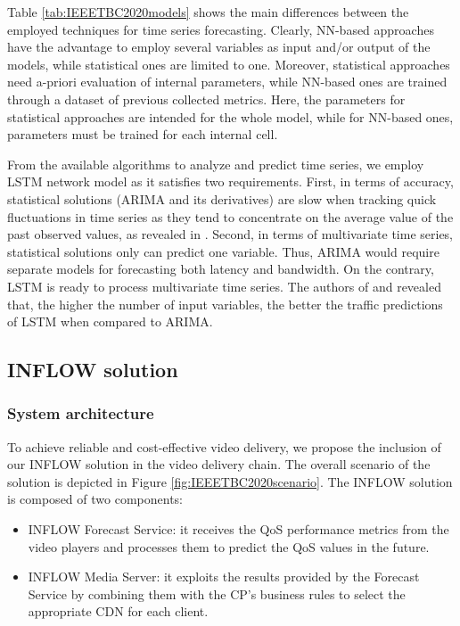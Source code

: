 Table \ref{tab:IEEETBC2020models} shows the main differences between the employed techniques for time series forecasting. Clearly, NN-based approaches have the advantage to employ several variables as input and/or output of the models, while statistical ones are limited to one. Moreover, statistical approaches need a-priori evaluation of internal parameters, while NN-based ones are trained through a dataset of previous collected metrics. Here, the parameters for statistical approaches are intended for the whole model, while for NN-based ones, parameters must be trained for each internal cell.

From the available algorithms to analyze and predict time series, we employ LSTM network model as it satisfies two requirements. First, in terms of accuracy, statistical solutions (ARIMA and its derivatives) are slow when tracking quick fluctuations in time series as they tend to concentrate on the average value of the past observed values, as revealed in \cite{wang2017}. Second, in terms of multivariate time series, statistical solutions only can predict one variable. Thus, ARIMA would require separate models for forecasting both latency and bandwidth. On the contrary, LSTM is ready to process multivariate time series. The authors of \cite{azari2019} and \cite{azari2019-2} revealed that, the higher the number of input variables, the better the traffic predictions of LSTM when compared to ARIMA.


\subsection{INFLOW solution}
\label{sec:system}

\subsubsection{System architecture}
\label{sec:detailedcontribution}

To achieve reliable and cost-effective video delivery, we propose the inclusion of our INFLOW solution in the video delivery chain. The overall scenario of the solution is depicted in Figure \ref{fig:IEEETBC2020scenario}. The INFLOW solution is composed of two components:
\begin{itemize}
	\item INFLOW Forecast Service: it receives the QoS performance metrics from the video players and processes them to predict the QoS values in the future.
	\item INFLOW Media Server: it exploits the results provided by the Forecast Service by combining them with the CP's business rules to select the appropriate CDN for each client.
\end{itemize}

